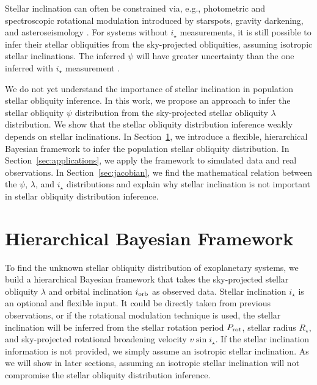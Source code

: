 \documentclass[twocolumn,times]{aastex631}
\begin{document}
Stellar inclination can often be constrained via, e.g., photometric and spectroscopic rotational modulation introduced by starspots, gravity darkening, and asteroseismology \citep[see][and references therein]{Albrecht22}.
For systems without $i_\star$ measurements, it is still possible to infer their stellar obliquities from the sky-projected obliquities, assuming isotropic stellar inclinations. The inferred $\psi$ will have greater uncertainty than the one inferred with $i_\star$ measurement \citep{Fabrycky09}.

We do not yet understand the importance of stellar inclination in population stellar obliquity inference.
In this work, we propose an approach to infer the stellar obliquity $\psi$ distribution from the sky-projected stellar obliquity $\lambda$ distribution. We show that the stellar obliquity distribution inference weakly depends on stellar inclinations.
In Section~\ref{sec:hbm}, we introduce a flexible, hierarchical Bayesian framework to infer the population stellar obliquity distribution.
In Section~\ref{sec:applications}, we apply the framework to simulated data and real observations.
In Section~\ref{sec:jacobian}, we find the mathematical relation between the $\psi$, $\lambda$, and $i_\star$ distributions and explain why stellar inclination is not important in stellar obliquity distribution inference.

\section{Hierarchical Bayesian Framework}\label{sec:hbm}

To find the unknown stellar obliquity distribution of exoplanetary systems, we build a hierarchical Bayesian framework that takes the sky-projected stellar obliquity $\lambda$ and orbital inclination $i_{\rm orb}$ as observed data. Stellar inclination $i_\star$ is an optional and flexible input. It could be directly taken from previous observations, or if the rotational modulation technique is used, the stellar inclination will be inferred from the stellar rotation period $P_{\rm rot}$, stellar radius $R_\star$, and sky-projected rotational broadening velocity $v\sin{i}_\star$. If the stellar inclination information is not provided, we simply assume an isotropic stellar inclination. As we will show in later sections, assuming an isotropic stellar inclination will not compromise the stellar obliquity distribution inference.
\end{document}
